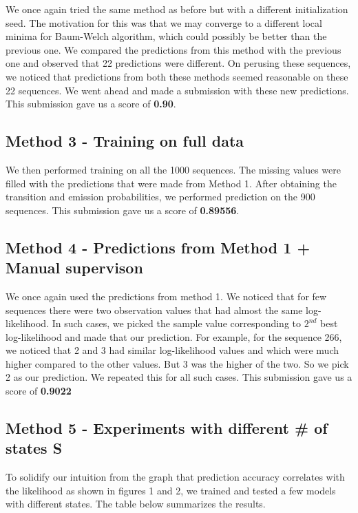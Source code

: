 \documentclass[12pt]{article}
\begin{document}
We once again tried the same method as before but with a different initialization seed. The motivation for this was that we may converge to a different local minima for Baum-Welch algorithm, which could possibly be better than the previous one. We compared the predictions from this method with the previous one and observed that 22 predictions were different. On perusing these sequences, we noticed that predictions from both these methods seemed reasonable on these 22 sequences. We went ahead and made a submission with these new predictions. This submission gave us a score of \textbf{0.90}.

\subsection*{Method 3 - Training on full data}

We then performed training on all the 1000 sequences. The missing values were filled with the predictions that were made from Method 1. After obtaining the transition and emission probabilities, we performed prediction on the 900 sequences. This submission gave us a score of \textbf{0.89556}.

\subsection*{Method 4 - Predictions from Method 1 + Manual supervison}

We once again used the predictions from method 1. We noticed that for few sequences there were two observation values that had almost the same log-likelihood. In such cases, we picked the sample value corresponding to $2^{nd}$ best log-likelihood and made that our prediction. For example, for the sequence 266, we noticed that 2 and 3 had similar log-likelihood values and which were much higher compared to the other values. But 3 was the higher of the two. So we pick 2 as our prediction. We repeated this for all such cases. This submission gave us a score of \textbf{0.9022}

\subsection*{Method 5 - Experiments with different \# of states S}

To solidify our intuition from the graph that prediction accuracy correlates with the likelihood as shown in figures 1 and 2, we trained and tested a few models with different states. The table below summarizes the results. 
\end{document}
